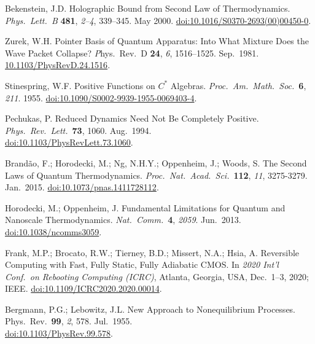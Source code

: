 \documentclass[preprints,article,accept,moreauthors,pdftex]{Definitions/mdpi}
\begin{document}
\begin{thebibliography}{999}
Bekenstein, J.D\@. Holographic Bound from Second Law of Thermodynamics. {\em Phys.\ Lett.\ B} {\bf 481}, {\em 2--4}, 339--345. May 2000. \href{https://doi.org/10.1016/S0370-2693(00)00450-0}{doi:10.1016/S0370-2693(00)00450-0}.

Zurek, W.H\@. Pointer Basis of Quantum Apparatus: Into What Mixture Does the Wave Packet Collapse? {\emph Phys.\ Rev.\ D} {\bf 24}, {\em 6}, 1516--1525. Sep.\ 1981. \href{https://doi.org/10.1103/PhysRevD.24.1516}{10.1103/PhysRevD.24.1516}.

Stinespring, W.F\@. Positive Functions on $C^{\ast}$ Algebras. {\em Proc.\ Am.\ Math.\ Soc.}\ {\bf 6}, {\em 211}. 1955. \href{https://doi.org/10.1090/S0002-9939-1955-0069403-4}{doi:10.1090/S0002-9939-1955-0069403-4}.

Pechukas, P\@. Reduced Dynamics Need Not Be Completely Positive. {\em Phys.\ Rev.\ Lett.}\ {\bf 73}, 1060. Aug.\ 1994.
\\[0pt]
\href{https://doi.org/10.1103/PhysRevLett.73.1060}{doi:10.1103/PhysRevLett.73.1060}.

Brandão, F.; Horodecki, M.; Ng, N.H.Y.; Oppenheim, J.; Woods, S\@. The Second Laws of Quantum Thermodynamics. {\em Proc.\ Nat.\ Acad.\ Sci.}\ {\bf 112}, {\em 11}, 3275-3279. Jan.\ 2015. \href{https://doi.org/10.1073/pnas.1411728112}{doi:10.1073/pnas.1411728112}.

Horodecki, M.; Oppenheim, J\@. Fundamental Limitations for Quantum and Nanoscale Thermodynamics. {\em Nat.\ Comm.}\ {\bf 4}, {\em 2059}. Jun.\ 2013. \href{https://doi.org/10.1038/ncomms3059}{doi:10.1038/ncomms3059}.

Frank, M.P.; Brocato, R.W.; Tierney, B.D.; Missert, N.A.; Hsia, A\@. Reversible Computing with Fast, Fully Static, Fully Adiabatic CMOS. In \emph{2020 Int'l Conf.\ on Rebooting Computing (ICRC)}, Atlanta, Georgia, USA, Dec.\ 1--3, 2020; IEEE. \href{https://doi.org/10.1109/ICRC2020.2020.00014}{doi:10.1109/ICRC2020.2020.00014}.

Bergmann, P.G.; Lebowitz, J.L\@. New Approach to Nonequilibrium Processes. {Phys.\ Rev.}\ {\bf 99}, {\em 2}, 578. Jul.\ 1955.
\\[0pt]
\href{https://doi.org/10.1103/PhysRev.99.578}{doi:10.1103/PhysRev.99.578}.


\end{thebibliography}
\end{document}
